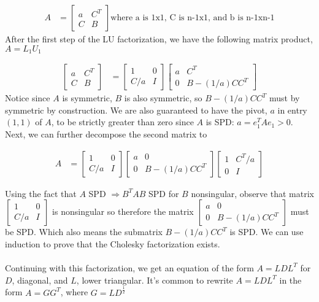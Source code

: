 \documentclass{article}
\begin{document}
\begin{align*}
    A &= \begin{bmatrix} a & C^T\\ C &  B \end{bmatrix} \textrm{where a is 1x1, C is n-1x1, and b is n-1xn-1}
\end{align*}
After the first step of the LU factorization, we have the following matrix product, $A = L_1U_1$

\begin{align*}
    \begin{bmatrix} a & C^T\\ C &  B \end{bmatrix} &= 
    \begin{bmatrix} 1 & 0\\ C/a &  I \end{bmatrix} 
    \begin{bmatrix} a & C^T\\ 0 & B - (1/a)CC^T \end{bmatrix}
\end{align*}
Notice since $A$ is symmetric, $B$ is also symmetric, so $B - (1/a)CC^T$ must by symmetric by construction. We are also guaranteed to have the pivot, $a$ in entry $(1,1)$ of $A$, to be strictly greater than zero since $A$ is SPD: $a = e_1^TAe_1 > 0$. Next, we can further decompose the second matrix to

\begin{align*}
    A &= \begin{bmatrix} 1 & 0\\ C/a &  I\end{bmatrix}
    \begin{bmatrix} a & 0\\ 0 & B - (1/a)CC^T \end{bmatrix}
    \begin{bmatrix} 1 & C^T/a\\ 0 & I \end{bmatrix}
\end{align*}

\noindent Using the fact that $A$ SPD $\Rightarrow B^TAB$ SPD for $B$ nonsingular, observe that matrix $\begin{bmatrix} 1 & 0\\ C/a &  I\end{bmatrix}$ is nonsingular so therefore the matrix $\begin{bmatrix} a & 0\\ 0 & B - (1/a)CC^T \end{bmatrix}$ must be SPD. Which also means the submatrix $B - (1/a)CC^T$ is SPD. We can use induction to prove that the Cholesky factorization exists.
\\ \\
Continuing with this factorization, we get an equation of the form $A = LDL^T$ for $D$, diagonal, and $L$, lower triangular. It's common to rewrite $A = LDL^T$ in the form $A = GG^T$, where $G = LD^{\frac{1}{2}}$
\end{document}
